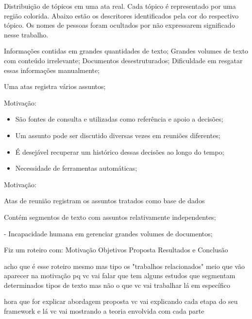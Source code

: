 \caption{Distribuição de tópicos em uma ata real. Cada tópico é representado por uma região colorida. Abaixo estão os descritores identificados pela cor do respectivo tópico. Os nomes de pessoas foram ocultados por não expressarem significado nesse trabalho.}





Informações contidas em grandes quantidades de texto;
Grandes volumes de texto com conteúdo irrelevante;
Documentos desestruturados;
Dificuldade em resgatar essas informações manualmente;


	\item Uma atas registra vários assuntos;

Motivação:
\begin{itemize}
	\item São fontes de consulta e utilizadas como referência e apoio a decisões; 
	\item Um assunto pode ser discutido diversas vezes em reuniões diferentes;
	\item É desejável recuperar um histórico dessas decisões ao longo do tempo;
	\item Necessidade de ferramentas automáticas;
\end{itemize}

Motivação:


Atas de reunião registram os assuntos tratados  como base de dados


\item Contém segmentos de texto com assuntos relativamente independentes; 



- Incapacidade humana em gerenciar grandes volumes de documentos;








Fiz um roteiro com:
Motivação
Objetivos
Proposta
Resultados
e Conclusão


acho que é esse roteiro mesmo
mas tipo
os "trabalhos relacionados"
meio que vão aparecer na motivação
pq vc vai falar que tem alguns estudos que segmentam determinados tipos de texto
mas não o que vc vai trabalhar lá em específico





hora que for explicar abordagem proposta
vc vai explicando cada etapa do seu framework
e lá vc vai mostrando a teoria envolvida com cada parte












